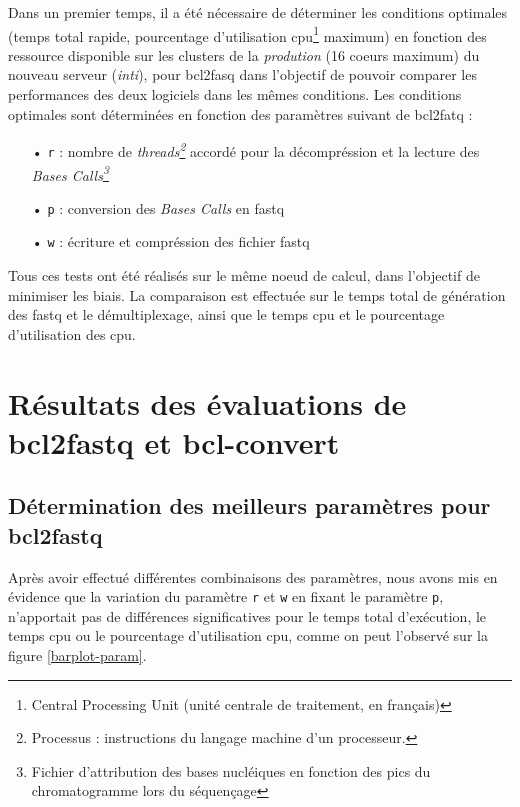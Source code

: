 Dans un premier temps, il a été nécessaire de déterminer les conditions optimales (temps total rapide, pourcentage d'utilisation cpu\footnote{Central Processing Unit (unité centrale de traitement, en français)} maximum) en fonction des ressource disponible sur les clusters de la \emph{prodution} (16 coeurs maximum) du nouveau serveur (\emph{inti}), pour bcl2fasq dans l'objectif de pouvoir comparer les performances des deux logiciels dans les mêmes conditions. Les conditions optimales sont déterminées en fonction des paramètres suivant de bcl2fatq : 
\begin{itemize}
    \item[•] \texttt{r} : nombre de \emph{threads\footnote{Processus : instructions du langage machine d'un processeur.}} accordé pour la décompréssion et la lecture des \emph{Bases Calls\footnote{Fichier d'attribution des bases nucléiques en fonction des pics du chromatogramme lors du séquençage}}
    \item[•] \texttt{p} : conversion des \emph{Bases Calls} en fastq
    \item[•] \texttt{w} : écriture et compréssion des fichier fastq
\end{itemize}

Tous ces tests ont été  réalisés sur le même noeud de calcul, dans l'objectif de minimiser les biais. La comparaison est effectuée sur le temps total de génération des fastq et le démultiplexage, ainsi que le temps cpu et le pourcentage d'utilisation des cpu.

\section{Résultats des évaluations de bcl2fastq et bcl-convert}

\subsection{Détermination des meilleurs paramètres pour bcl2fastq}
Après avoir effectué différentes combinaisons des paramètres, nous avons mis en évidence que la variation du paramètre \texttt{r} et \texttt{w} en fixant le paramètre \texttt{p}, n'apportait pas de différences significatives pour le temps total d'exécution, le temps cpu ou le pourcentage d'utilisation cpu, comme on peut l'observé sur la figure \ref{barplot-param}. 

